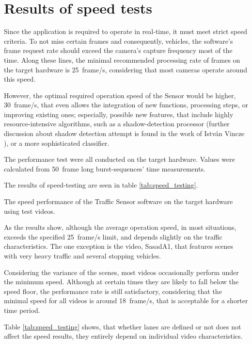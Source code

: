 \clearpage
\addtolength{\topmargin}{+.6in}
\section{Results of speed tests}\label{sec:speed_tests}
Since the application is required to operate in real-time, it must meet strict speed criteria.
To not miss certain frames and consequently, vehicles, the software's frame request rate should exceed the camera's capture frequency most of the time.
Along these lines, the minimal recommended processing rate of frames on the target hardware is \SI{25}{frame/s}, considering that most cameras operate around this speed.

However, the optimal required operation speed of the Sensor would be higher, \SI{30}{frame/s}, that even allows the integration of new functions, processing steps, or improving existing ones; especially, possible new features, that include highly resource-intensive algorithms, such as a shadow-detection processor (further discussion about shadow detection attempt is found in the work of Istv{\'a}n Vincze \cite{Vincze2016}), or a more sophisticated classifier.

The performance test were all conducted on the target hardware. Values were calculated from \SI{50}{frame} long burst-sequences' time measurements.

The results of speed-testing are seen in table \ref{tab:speed_testing}.

\begin{table}[htbp]
	\centering
	\begin{adjustbox}{center}
	\end{adjustbox}
	\caption{The speed performance of the Traffic Sensor software on the target hardware using test videos.}
	\label{tab:speed_testing}%
\end{table}%

As the results show, although the average operation speed, in most situations, exceeds the specified \SI{25}{frame/s} limit, and depends slightly on the traffic characteristics.
The one exception is the video, SasadA1, that features scenes with very heavy traffic and several stopping vehicles.

Considering the variance of the scenes, most videos occasionally perform under the minimum speed.
Although at certain times they are likely to fall below the speed floor, the performance rate is still satisfactory, considering that the minimal speed for all videos is around \SI{18}{frame/s}, that is acceptable for a shorter time period.

Table \ref{tab:speed_testing} shows, that whether lanes are defined or not does not affect the speed results, they entirely depend on individual video characteristics.
